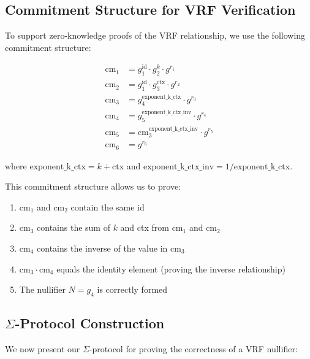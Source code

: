 \subsection{Commitment Structure for VRF Verification}

To support zero-knowledge proofs of the VRF relationship, we use the following commitment structure:

\begin{align}
\text{cm}_1 &= g_1^{\text{id}} \cdot g_2^{k} \cdot g^{r_1} \\
\text{cm}_2 &= g_1^{\text{id}} \cdot g_3^{\text{ctx}} \cdot g^{r_2} \\
\text{cm}_3 &= g_4^{\text{exponent\_k\_ctx}} \cdot g^{r_3} \\
\text{cm}_4 &= g_5^{\text{exponent\_k\_ctx\_inv}} \cdot g^{r_4} \\
\text{cm}_5 &= \text{cm}_3^{\text{exponent\_k\_ctx\_inv}} \cdot g^{r_5} \\
\text{cm}_6 &= g^{r_6}
\end{align}

where $\text{exponent\_k\_ctx} = k + \text{ctx}$ and $\text{exponent\_k\_ctx\_inv} = 1/\text{exponent\_k\_ctx}$.

This commitment structure allows us to prove:
\begin{enumerate}
    \item $\text{cm}_1$ and $\text{cm}_2$ contain the same id
    \item $\text{cm}_3$ contains the sum of $k$ and ctx from $\text{cm}_1$ and $\text{cm}_2$
    \item $\text{cm}_4$ contains the inverse of the value in $\text{cm}_3$
    \item $\text{cm}_3 \cdot \text{cm}_4$ equals the identity element (proving the inverse relationship)
    \item The nullifier $N = g_4$ is correctly formed
\end{enumerate}

\subsection{$\Sigma$-Protocol Construction}

We now present our $\Sigma$-protocol for proving the correctness of a VRF nullifier:

